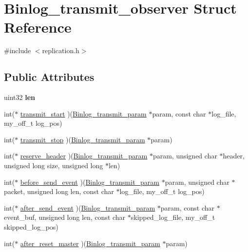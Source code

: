 \hypertarget{structBinlog__transmit__observer}{}\section{Binlog\+\_\+transmit\+\_\+observer Struct Reference}
\label{structBinlog__transmit__observer}


{\ttfamily \#include $<$replication.\+h$>$}

\subsection*{Public Attributes}
\begin{DoxyCompactItemize}
\item 
\mbox{\label{structBinlog__transmit__observer_a8d787ff0a59c8492f66ba5a97e53feda}} 
uint32 {\bfseries len}
\item 
int($\ast$ \mbox{\hyperlink{structBinlog__transmit__observer_ab313f8145b55a6516306ce6d42920c6d}{transmit\+\_\+start}} )(\mbox{\hyperlink{structBinlog__transmit__param}{Binlog\+\_\+transmit\+\_\+param}} $\ast$param, const char $\ast$log\+\_\+file, my\+\_\+off\+\_\+t log\+\_\+pos)
\item 
int($\ast$ \mbox{\hyperlink{structBinlog__transmit__observer_ae7e1f7cf7a2c6dd91bb7ec35085de544}{transmit\+\_\+stop}} )(\mbox{\hyperlink{structBinlog__transmit__param}{Binlog\+\_\+transmit\+\_\+param}} $\ast$param)
\item 
int($\ast$ \mbox{\hyperlink{structBinlog__transmit__observer_a12738815385bce81ff8a5b109ace7e81}{reserve\+\_\+header}} )(\mbox{\hyperlink{structBinlog__transmit__param}{Binlog\+\_\+transmit\+\_\+param}} $\ast$param, unsigned char $\ast$header, unsigned long size, unsigned long $\ast$len)
\item 
int($\ast$ \mbox{\hyperlink{structBinlog__transmit__observer_a6b305e8efbe26c1d60ee9ca882476b36}{before\+\_\+send\+\_\+event}} )(\mbox{\hyperlink{structBinlog__transmit__param}{Binlog\+\_\+transmit\+\_\+param}} $\ast$param, unsigned char $\ast$packet, unsigned long len, const char $\ast$log\+\_\+file, my\+\_\+off\+\_\+t log\+\_\+pos)
\item 
int($\ast$ \mbox{\hyperlink{structBinlog__transmit__observer_abd4c85bf449108fec519176238621733}{after\+\_\+send\+\_\+event}} )(\mbox{\hyperlink{structBinlog__transmit__param}{Binlog\+\_\+transmit\+\_\+param}} $\ast$param, const char $\ast$event\+\_\+buf, unsigned long len, const char $\ast$skipped\+\_\+log\+\_\+file, my\+\_\+off\+\_\+t skipped\+\_\+log\+\_\+pos)
\item 
int($\ast$ \mbox{\hyperlink{structBinlog__transmit__observer_a1accd815cbf533bc1cfb2d3985975a6b}{after\+\_\+reset\+\_\+master}} )(\mbox{\hyperlink{structBinlog__transmit__param}{Binlog\+\_\+transmit\+\_\+param}} $\ast$param)
\end{DoxyCompactItemize}


